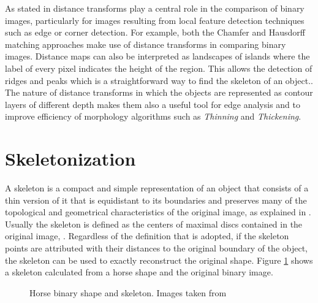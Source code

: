 As stated in \cite{dtresearch2} 
distance transforms play a central role in the comparison of binary images, 
particularly for images resulting from local feature detection techniques such 
as edge or corner detection. For example, both the Chamfer
and Hausdorff matching approaches make use of distance transforms in comparing binary images. 
Distance maps can also be interpreted as landscapes of islands 
where the label of every pixel indicates the height of the region. This allows
the detection of ridges and peaks which is a straightforward way to find the
skeleton of an object.\cite[237]{ridgedt}. The nature of distance transforms
in which the objects are represented as contour layers of different depth
makes them also a useful tool for edge analysis and to improve efficiency of 
morphology algorithms such as \emph{Thinning} and \emph{Thickening}.\\

\section{Skeletonization}
\label{sec:skeletonization}

A skeleton is a compact and simple representation of an object that consists of a thin
version of it that is equidistant to its boundaries and preserves many of
the topological and geometrical characteristics of the original image, as explained in
\cite{wikipedia:skeleton,ssm,augmented}. Usually the skeleton is defined as the centers
of maximal discs contained in the original image, \cite{ssm,augmented}.
Regardless of the definition that is adopted, if the skeleton points are attributed with their distances
to the original boundary of the object, the skeleton can be used to exactly 
reconstruct the original shape. Figure \ref{fig:genskeleton} shows a skeleton calculated
from a horse shape and the original binary image.\\

\begin{figure}[h t b p ! H]
  \centering
\qquad
  \caption[Horse binary shape and skeleton]{Horse binary shape and skeleton. 
Images taken from \cite{ssm}}
  \label{fig:genskeleton}
\end{figure}


